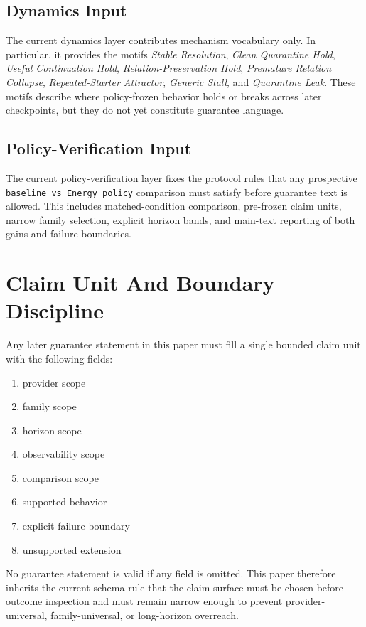 \documentclass[11pt]{article}
\begin{document}
\subsection{Dynamics Input}

The current dynamics layer contributes mechanism vocabulary only. In particular, it
provides the motifs \textit{Stable Resolution}, \textit{Clean Quarantine Hold},
\textit{Useful Continuation Hold}, \textit{Relation-Preservation Hold},
\textit{Premature Relation Collapse}, \textit{Repeated-Starter Attractor},
\textit{Generic Stall}, and \textit{Quarantine Leak}. These motifs describe where
policy-frozen behavior holds or breaks across later checkpoints, but they do not
yet constitute guarantee language.

\subsection{Policy-Verification Input}

The current policy-verification layer fixes the protocol rules that any prospective
\texttt{baseline vs Energy policy} comparison must satisfy before guarantee text is
allowed. This includes matched-condition comparison, pre-frozen claim units, narrow
family selection, explicit horizon bands, and main-text reporting of both gains and
failure boundaries.

\section{Claim Unit And Boundary Discipline}

Any later guarantee statement in this paper must fill a single bounded claim unit
with the following fields:

\begin{enumerate}
\item provider scope
\item family scope
\item horizon scope
\item observability scope
\item comparison scope
\item supported behavior
\item explicit failure boundary
\item unsupported extension
\end{enumerate}

No guarantee statement is valid if any field is omitted. This paper therefore
inherits the current schema rule that the claim surface must be chosen before
outcome inspection and must remain narrow enough to prevent provider-universal,
family-universal, or long-horizon overreach.
\end{document}
